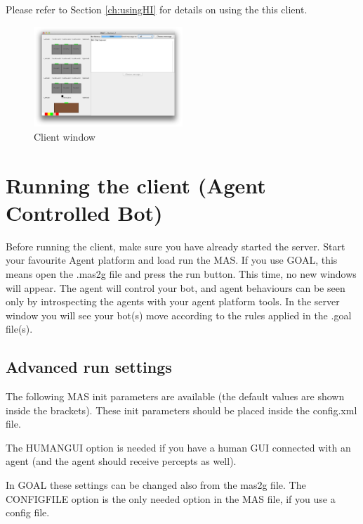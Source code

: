 \documentclass[11pt,a4paper]{article}
\begin{document}
Please refer to Section  \ref{ch:usingHI} for details on using the this client.

\begin{figure}[!h]
\begin{center}
  \includegraphics[width=0.5\textwidth]{HumanPlayerGUI/hpg.png}
  \caption{Client window}\label{fig:Client}
\end{center}
\end{figure}


\section{Running the client (Agent Controlled Bot)}
Before running the client, make sure you have already started the server. Start your favourite Agent platform and load run the MAS. If you use GOAL, this means open the .mas2g file and press the run button. This time, no new windows will appear. The agent will control your bot,  and agent behaviours can be seen only by introspecting the agents with your agent platform tools. In the server window you will see your bot(s) move according to the rules applied in the .goal file(s).

\subsection{Advanced run settings}
\label{sec:clientadvancedrunsettings}
The following MAS init parameters are available (the default values are shown inside the brackets). These init parameters should be placed inside the config.xml file. 

The HUMANGUI option is needed if you have a human GUI connected with an agent (and the agent should receive percepts as well).

In GOAL these settings can be changed also from the mas2g file. The CONFIGFILE option is the only needed option in the MAS file, if you use a config file.  
\end{document}
